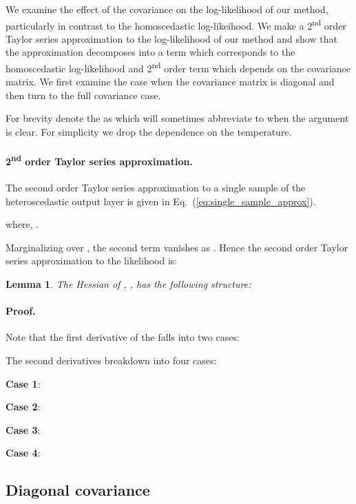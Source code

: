 \documentclass[final]{cvpr}
\newtheorem{lemma}[theorem]{Lemma}
\begin{document}
We examine the effect of the covariance on the log-likelihood of our method, particularly in contrast to the homoscedastic log-likeihood. We make a 2\textsuperscript{nd} order Taylor series approximation to the log-likelihood of our method and show that the approximation decomposes into a term which corresponds to the homoscedastic log-likelihood and 2\textsuperscript{nd} order term which depends on the covariance matrix. We first examine the case when the covariance matrix is diagonal and then turn to the full covariance case.

For brevity denote the  as  which will sometimes abbreviate to  when the  argument is clear. For simplicity we drop the dependence on the  temperature.

\paragraph{2\textsuperscript{nd} order Taylor series approximation.}

The second order Taylor series approximation to a single sample of the heteroscedastic output layer is given in Eq.~(\ref{eq:single_sample_approx}).



where, .

Marginalizing over , the second term vanishes as . Hence the second order Taylor series approximation to the likelihood is:



\begin{lemma}
The Hessian of , , has the following structure:

\end{lemma}

\paragraph{Proof.}
Note that the first derivative of the  falls into two cases:


\noindent
The second derivatives breakdown into four cases:

\textbf{Case 1}: 

\textbf{Case 2}: 

\textbf{Case 3}: 

\textbf{Case 4}: 

\subsection{Diagonal covariance}
\end{document}
